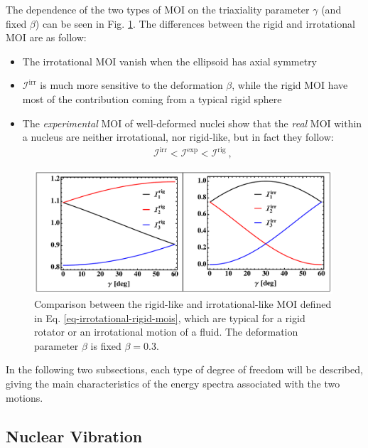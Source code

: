 The dependence of the two types of MOI on the triaxiality parameter $\gamma$ (and fixed $\beta$) can be seen in Fig. \ref{fig-irrotational-rigid-mois}. The differences between the rigid and irrotational MOI are as follow:
\begin{itemize}
    \item The irrotational MOI vanish when the ellipsoid has axial symmetry
    \item $\mathcal{I}^\text{irr}$ is much more sensitive to the deformation $\beta$, while the rigid MOI have most of the contribution coming from a typical rigid sphere
    \item The \emph{experimental} MOI of well-deformed nuclei show that the \emph{real} MOI within a nucleus are neither irrotational, nor rigid-like, but in fact they follow:
    \begin{align}
        \mathcal{I}^\text{irr}<\mathcal{I}^\text{exp}<\mathcal{I}^\text{rig}\ ,
        \label{experimental-MOI-vs-rig-irr}
    \end{align}
\end{itemize}
\begin{figure}
    \centering
    \includegraphics[width=0.99\textwidth]{Chapters/Figures/mois_rig_irr.pdf}
    \caption{Comparison between the rigid-like and irrotational-like MOI defined in Eq. \ref{eq-irrotational-rigid-mois}, which are typical for a rigid rotator or an irrotational motion of a fluid. The deformation parameter $\beta$ is fixed $\beta=0.3$.}
    \label{fig-irrotational-rigid-mois}
\end{figure}

In the following two subsections, each type of degree of freedom will be described, giving the main characteristics of the energy spectra associated with the two motions. 

\subsection{Nuclear Vibration}

